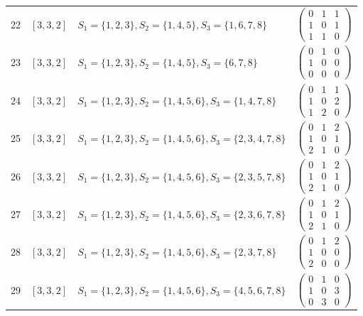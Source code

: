 \begin{longtable}{@{}r>{\raggedright\arraybackslash}p{1.5cm}>{\raggedright\arraybackslash}p{8.4cm}>{\raggedright\arraybackslash}p{4.2cm}@{}}
22 & $[3,3,2]$ & $S_{1}=\{1,2,3\}, S_{2}=\{1,4,5\}, S_{3}=\{1,6,7,8\}$ & $\left(\begin{smallmatrix}0 & 1 & 1\\1 & 0 & 1\\1 & 1 & 0\end{smallmatrix}\right)$ \\
23 & $[3,3,2]$ & $S_{1}=\{1,2,3\}, S_{2}=\{1,4,5\}, S_{3}=\{6,7,8\}$ & $\left(\begin{smallmatrix}0 & 1 & 0\\1 & 0 & 0\\0 & 0 & 0\end{smallmatrix}\right)$ \\
24 & $[3,3,2]$ & $S_{1}=\{1,2,3\}, S_{2}=\{1,4,5,6\}, S_{3}=\{1,4,7,8\}$ & $\left(\begin{smallmatrix}0 & 1 & 1\\1 & 0 & 2\\1 & 2 & 0\end{smallmatrix}\right)$ \\
25 & $[3,3,2]$ & $S_{1}=\{1,2,3\}, S_{2}=\{1,4,5,6\}, S_{3}=\{2,3,4,7,8\}$ & $\left(\begin{smallmatrix}0 & 1 & 2\\1 & 0 & 1\\2 & 1 & 0\end{smallmatrix}\right)$ \\
26 & $[3,3,2]$ & $S_{1}=\{1,2,3\}, S_{2}=\{1,4,5,6\}, S_{3}=\{2,3,5,7,8\}$ & $\left(\begin{smallmatrix}0 & 1 & 2\\1 & 0 & 1\\2 & 1 & 0\end{smallmatrix}\right)$ \\
27 & $[3,3,2]$ & $S_{1}=\{1,2,3\}, S_{2}=\{1,4,5,6\}, S_{3}=\{2,3,6,7,8\}$ & $\left(\begin{smallmatrix}0 & 1 & 2\\1 & 0 & 1\\2 & 1 & 0\end{smallmatrix}\right)$ \\
28 & $[3,3,2]$ & $S_{1}=\{1,2,3\}, S_{2}=\{1,4,5,6\}, S_{3}=\{2,3,7,8\}$ & $\left(\begin{smallmatrix}0 & 1 & 2\\1 & 0 & 0\\2 & 0 & 0\end{smallmatrix}\right)$ \\
29 & $[3,3,2]$ & $S_{1}=\{1,2,3\}, S_{2}=\{1,4,5,6\}, S_{3}=\{4,5,6,7,8\}$ & $\left(\begin{smallmatrix}0 & 1 & 0\\1 & 0 & 3\\0 & 3 & 0\end{smallmatrix}\right)$ \\

\end{longtable}
